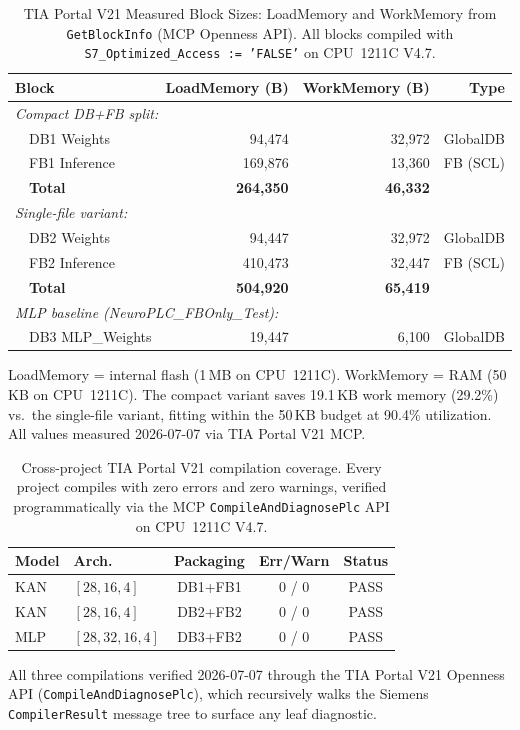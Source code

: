 \documentclass[journal,onecolumn]{IEEEtran}
\begin{document}
\begin{table}[tb]
\centering
\caption{TIA Portal V21 Measured Block Sizes: LoadMemory and WorkMemory
from \texttt{GetBlockInfo} (MCP Openness API). All blocks compiled with
\texttt{S7\_Optimized\_Access := 'FALSE'} on CPU~1211C V4.7.}
\label{tab:tia_blocks}
\footnotesize
\begin{tabular}{@{}lrrr@{}}
\toprule
\textbf{Block} & \textbf{LoadMemory (B)} & \textbf{WorkMemory (B)} & \textbf{Type} \\
\midrule
\multicolumn{4}{l}{\textit{Compact DB+FB split:}} \\
~~DB1 Weights  & 94{,}474 & 32{,}972 & GlobalDB \\
~~FB1 Inference & 169{,}876 & 13{,}360 & FB (SCL) \\
~~\textbf{Total}     & \textbf{264{,}350} & \textbf{46{,}332} & \\
\midrule
\multicolumn{4}{l}{\textit{Single-file variant:}} \\
~~DB2 Weights  & 94{,}447 & 32{,}972 & GlobalDB \\
~~FB2 Inference & 410{,}473 & 32{,}447 & FB (SCL) \\
~~\textbf{Total}              & \textbf{504{,}920} & \textbf{65{,}419} & \\
\midrule
\multicolumn{4}{l}{\textit{MLP baseline (NeuroPLC\_FBOnly\_Test):}} \\
~~DB3 MLP\_Weights & 19{,}447 & 6{,}100 & GlobalDB \\
\bottomrule
\end{tabular}
\vspace{2pt}
{\scriptsize LoadMemory = internal flash (1\,MB on CPU~1211C). WorkMemory =
RAM (50\,KB on CPU~1211C). The compact variant saves 19.1\,KB work memory
(29.2\%) vs.\ the single-file variant, fitting within the 50\,KB budget at
90.4\% utilization. All values measured 2026-07-07 via TIA Portal V21 MCP.}
\end{table}

\begin{table}[t]
\centering
\caption{Cross-project TIA Portal V21 compilation coverage. Every project
compiles with zero errors and zero warnings, verified programmatically via the
MCP \texttt{CompileAndDiagnosePlc} API on CPU~1211C V4.7.}
\label{tab:tia_compile}
\small
\begin{tabular}{@{}llccc@{}}
\toprule
\textbf{Model} & \textbf{Arch.} & \textbf{Packaging} & \textbf{Err/Warn} & \textbf{Status} \\
\midrule
KAN & $[28,16,4]$    & DB1+FB1 & 0 / 0 & PASS \\
KAN & $[28,16,4]$    & DB2+FB2 & 0 / 0 & PASS \\
MLP & $[28,32,16,4]$ & DB3+FB2 & 0 / 0 & PASS \\
\bottomrule
\end{tabular}
\vspace{2pt}
{\scriptsize All three compilations verified 2026-07-07 through the TIA Portal
V21 Openness API (\texttt{CompileAndDiagnosePlc}), which recursively walks the
Siemens \texttt{CompilerResult} message tree to surface any leaf diagnostic.}
\end{table}
\end{document}
